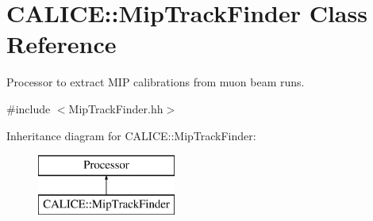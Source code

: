 \section{C\-A\-L\-I\-C\-E\-:\-:Mip\-Track\-Finder Class Reference}
\label{classCALICE_1_1MipTrackFinder}


Processor to extract M\-I\-P calibrations from muon beam runs.  




{\ttfamily \#include $<$Mip\-Track\-Finder.\-hh$>$}

Inheritance diagram for C\-A\-L\-I\-C\-E\-:\-:Mip\-Track\-Finder\-:\begin{figure}[H]
\begin{center}
\leavevmode
\includegraphics[height=2.000000cm]{classCALICE_1_1MipTrackFinder}
\end{center}
\end{figure}
